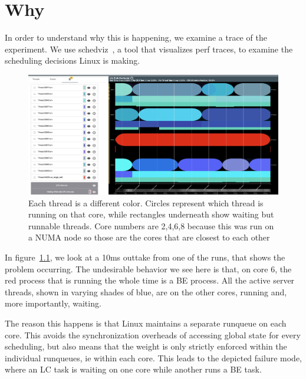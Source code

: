 
\chapter{Why}



In order to understand why this is happening, we examine a trace of the
experiment. We use schedviz~\cite{schedviz}, a tool that visualizes perf traces,
to examine the scheduling decisions Linux is making.

\begin{figure}[t]
    \centering
    \includegraphics[width=\textwidth]{graphs/schedviz.png}
        \caption{Each thread is a different color. Circles represent which
    thread is running on that core, while rectangles underneath show waiting but
    runnable threads. Core numbers are 2,4,6,8 because this was run on a NUMA
    node so those are the cores that are closest to each other
    }\label{fig:schedviz}
\end{figure}

In figure~\ref{fig:schedviz}, we look at a 10ms outtake from one of the runs,
that shows the problem occurring. The undesirable behavior we see here is that,
on core 6, the red process that is running the whole time is a BE process. All
the active server threads, shown in varying shades of blue, are on the other
cores, running and, more importantly, waiting.

The reason this happens is that Linux maintains a separate runqueue on each
core. This avoids the synchronization overheads of accessing global state for
every scheduling, but also means that the weight is only strictly enforced
within the individual runqueues, ie within each core. This leads to the depicted
failure mode, where an LC task is waiting on one core while another runs a BE
task.

